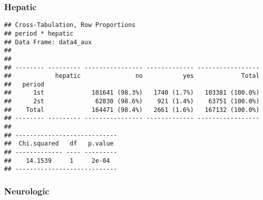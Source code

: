 \documentclass[
]{article}
\newenvironment{Shaded}{\begin{snugshade}}{\end{snugshade}}
\newcommand{\DataTypeTok}[1]{\textcolor[rgb]{0.13,0.29,0.53}{#1}}
\newcommand{\KeywordTok}[1]{\textcolor[rgb]{0.13,0.29,0.53}{\textbf{#1}}}
\newcommand{\NormalTok}[1]{#1}
\newcommand{\OperatorTok}[1]{\textcolor[rgb]{0.81,0.36,0.00}{\textbf{#1}}}
\newcommand{\OtherTok}[1]{\textcolor[rgb]{0.56,0.35,0.01}{#1}}
\newcommand{\StringTok}[1]{\textcolor[rgb]{0.31,0.60,0.02}{#1}}
\begin{document}
\hypertarget{hepatic}{%
\subsubsection{Hepatic}\label{hepatic}}

\begin{Shaded}
\end{Shaded}

\begin{verbatim}
## Cross-Tabulation, Row Proportions  
## period * hepatic  
## Data Frame: data4_aux  
## 
## 
## -------- --------- ---------------- ------------- -----------------
##            hepatic               no           yes             Total
##   period                                                           
##      1st             101641 (98.3%)   1740 (1.7%)   103381 (100.0%)
##      2st              62830 (98.6%)    921 (1.4%)    63751 (100.0%)
##    Total             164471 (98.4%)   2661 (1.6%)   167132 (100.0%)
## -------- --------- ---------------- ------------- -----------------
## 
## ----------------------------
##  Chi.squared   df   p.value 
## ------------- ---- ---------
##    14.1539     1     2e-04  
## ----------------------------
\end{verbatim}

\hypertarget{neurologic}{%
\subsubsection{Neurologic}\label{neurologic}}

\begin{Shaded}
\end{Shaded}
\end{document}
